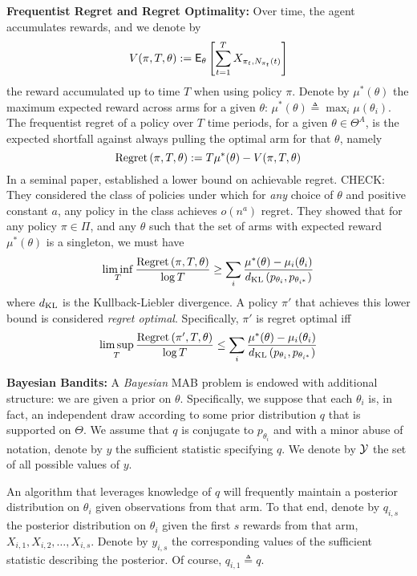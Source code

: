 \noindent\textbf{\textsf{Frequentist Regret and Regret Optimality:}} Over time, the agent accumulates rewards, and we denote by 
\[
V(\pi, T, \theta) := 
\mathsf{E}_\theta \left[
	\sum_{t=1}^T
	X_{
		\pi_t,
		N_{\pi_t}(t)
	}
\right]
\] 
the reward accumulated up to time $T$ when using policy $\pi$. Denote by $\mu^*(\theta)$ the maximum expected reward across arms for a given $\theta$:  $\mu^*(\theta) \triangleq \max_i \mu(\theta_i)$. The frequentist regret of a policy over $T$ time periods, for a given $\theta \in \Theta^A$, is the expected shortfall against always pulling the optimal arm for that $\theta$, namely
\[
\textnormal{Regret} \left( \pi, T, \theta \right) := 
T \mu^*(\theta) -
V(\pi, T, \theta)
\]
In a seminal paper, \cite{lai1985asymptotically} established a lower bound on achievable regret. {\color{red} CHECK: They considered the class of policies under which for {\em any} choice of $\theta$ and positive constant $a$, any policy in the class achieves $o(n^a)$ regret.} They showed that for any policy $\pi \in \Pi$, and any $\theta$ such that the set of arms with expected reward $\mu^*(\theta)$ is a singleton, we must have
\begin{equation}
\label{eq:lai_robbins_lb}
\liminf_T
\frac{
	\textnormal{Regret} \left( \pi, T, \theta \right)
}
{
	\log T
}
\geq
\sum_{i}
\frac{\mu^*(\theta) - \mu_i(\theta_i)}{d_{\rm KL}\left(p_{\theta_i},p_{\theta_{i^*}} \right)}
\end{equation}
where $d_{\rm KL}$ is the Kullback-Liebler divergence. A policy $\pi'$ that achieves this lower bound is considered {\em regret optimal}. Specifically, $\pi'$ is regret optimal iff 
\[
\limsup_T
\frac{
	\textnormal{Regret} \left( \pi', T, \theta \right)
}
{
	\log T
}
\leq
\sum_{i}
\frac{\mu^*(\theta) - \mu_i(\theta_i)}{d_{\rm KL}\left(p_{\theta_i},p_{\theta_{i^*}} \right)}
\]

\noindent\textbf{\textsf{Bayesian Bandits: }}A {\em Bayesian} MAB problem is endowed with additional structure: we are given a prior on $\theta$. Specifically, we suppose that each $\theta_i$ is, in fact, an independent draw according to some prior distribution $q$ that is supported on $\Theta$. We assume that $q$ is conjugate to $p_{\theta_i}$ and with a minor abuse of notation, denote by $y$ the sufficient statistic specifying $q$. We denote by $\mathcal Y$ the set of all possible values of $y$. 

An algorithm that leverages knowledge of $q$ will frequently maintain a posterior distribution on $\theta_i$ given observations from that arm. To that end, denote by $q_{i,s}$ the posterior distribution on $\theta_i$ given the first $s$ rewards from that arm, $X_{i,1},X_{i,2},\dots,X_{i,s}$. Denote by $y_{i,s}$ the corresponding values of the sufficient statistic describing the posterior. Of course, $q_{i,1} \triangleq q$. 

